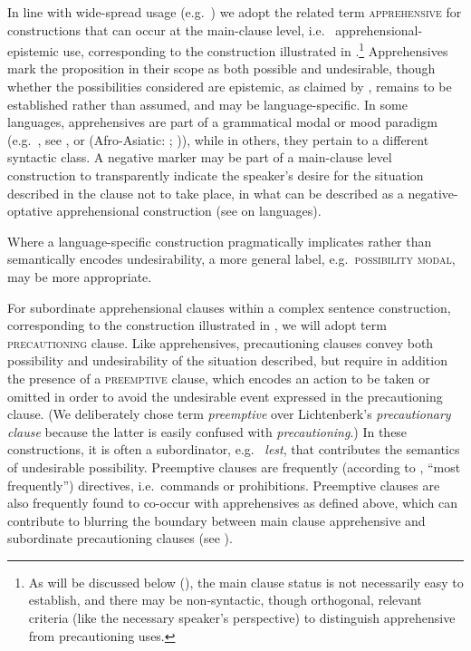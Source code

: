 \documentclass[output=paper,colorlinks,citecolor=brown]{langscibook}
\begin{document}
In line with wide-spread usage (e.g.\ \cite{Dobrushina2006,pakendorfschalley2007,angeloschultzeberndt2016,vuillermet2018a}) we adopt the related term \textsc{apprehensive} for constructions that can occur at the main-clause level, i.e.\  apprehensional-epistemic use, corresponding to the  construction illustrated in .\footnote{As will be discussed below (), the main clause status is not necessarily easy to establish, and there may be non-syntactic, though orthogonal, relevant criteria (like the necessary speaker's perspective) to distinguish apprehensive from precautioning uses.} Apprehensives mark the proposition in their scope as both possible and undesirable, though whether the possibilities considered are epistemic, as claimed by \citet{lichtenberk1995}, remains to be established rather than assumed, and may be language-specific. In some languages, apprehensives are part of a grammatical modal or mood paradigm (e.g.\  , see , or  (Afro-Asiatic: ; \citealt{chapters/treis})), while in others, they pertain to a different syntactic class. A negative marker may be part of a main-clause level construction to transparently indicate the speaker's desire for the situation described in the clause not to take place, in what can be described as a negative-optative apprehensional construction (see \citealt{chapters/wiemer} on  languages).

Where a language-specific construction pragmatically implicates rather than semantically encodes undesirability, a more general label, e.g.\ \textsc{possibility modal}, may be more appropriate.

For subordinate apprehensional clauses within a complex sentence construction, corresponding to the  construction illustrated in , we will adopt   term \textsc{precautioning} clause. Like apprehensives, precautioning clauses convey both possibility and undesirability of the situation described, but require in addition the presence of a \textsc{preemptive} clause, which encodes an action to be taken or omitted in order to avoid the undesirable event expressed in the precautioning clause. (We deliberately chose  term \textit{preemptive} over Lichtenberk's \textit{precautionary clause} because the latter is easily confused with \textit{precautioning}.) In these constructions, it is often a subordinator, e.g.\  \textit{lest}, that contributes the semantics of undesirable possibility. Preemptive clauses are frequently (according to \citet[24]{dixon2009}, ``most frequently'') directives, i.e.\ commands or prohibitions. Preemptive clauses are also frequently found to co-occur with apprehensives as defined above, which can contribute to blurring the boundary between main clause apprehensive and subordinate precautioning clauses (see ).
\end{document}
